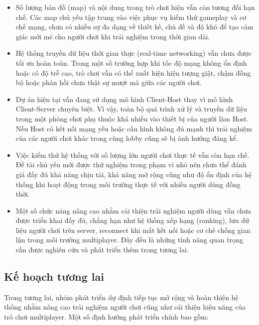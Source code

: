 \begin{itemize}
    \item Số lượng bản đồ (map) và nội dung trong trò chơi hiện vẫn còn tương đối hạn chế. Các map chủ yếu tập trung vào việc phục vụ kiểm thử gameplay và cơ chế mạng, chưa có nhiều sự đa dạng về thiết kế, chủ đề và độ khó để tạo cảm giác mới mẻ cho người chơi khi trải nghiệm trong thời gian dài.

    \item Hệ thống truyền dữ liệu thời gian thực (real-time networking) vẫn chưa được tối ưu hoàn toàn. Trong một số trường hợp khi tốc độ mạng không ổn định hoặc có độ trễ cao, trò chơi vẫn có thể xuất hiện hiện tượng giật, chậm đồng bộ hoặc phản hồi chưa thật sự mượt mà giữa các người chơi.

    \item Dự án hiện tại vẫn đang sử dụng mô hình Client-Host thay vì mô hình Client-Server chuyên biệt. Vì vậy, toàn bộ quá trình xử lý và truyền dữ liệu trong một phòng chơi phụ thuộc khá nhiều vào thiết bị của người làm Host. Nếu Host có kết nối mạng yếu hoặc cấu hình không đủ mạnh thì trải nghiệm của các người chơi khác trong cùng lobby cũng sẽ bị ảnh hưởng đáng kể.

    \item Việc kiểm thử hệ thống với số lượng lớn người chơi thực tế vẫn còn hạn chế. Đề tài chủ yếu mới được thử nghiệm trong phạm vi nhỏ nên chưa thể đánh giá đầy đủ khả năng chịu tải, khả năng mở rộng cũng như độ ổn định của hệ thống khi hoạt động trong môi trường thực tế với nhiều người dùng đồng thời.

    \item Một số chức năng nâng cao nhằm cải thiện trải nghiệm người dùng vẫn chưa được triển khai đầy đủ, chẳng hạn như hệ thống xếp hạng (ranking), lưu dữ liệu người chơi trên server, reconnect khi mất kết nối hoặc cơ chế chống gian lận trong môi trường multiplayer. Đây đều là những tính năng quan trọng cần được nghiên cứu và phát triển thêm trong tương lai.
\end{itemize}

\subsection{Kế hoạch tương lai}

Trong tương lai, nhóm phát triển dự định tiếp tục mở rộng và hoàn thiện hệ thống nhằm nâng cao trải nghiệm người chơi cũng như cải thiện hiệu năng của trò chơi multiplayer. Một số định hướng phát triển chính bao gồm:

